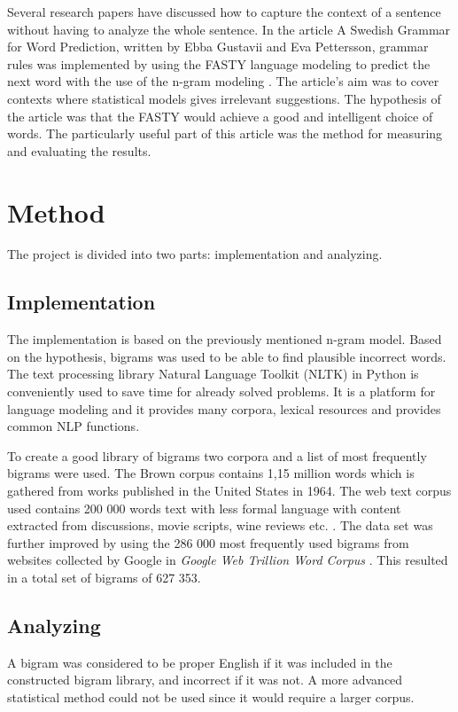 \documentclass[a4paper,12pt]{article}
\begin{document}
Several research papers have discussed how to capture the context of a sentence without having to analyze the whole sentence. In the article A Swedish Grammar for Word Prediction, written by Ebba Gustavii and Eva Pettersson, grammar rules was implemented by using the FASTY language modeling to predict the next word with the use of the n-gram modeling \cite{gustavii2003a}. The article's aim was to cover contexts where statistical models gives irrelevant suggestions. The hypothesis of the article was that the FASTY would achieve a good and intelligent choice of words. The particularly useful part of this article was the method for measuring and evaluating the results.

\section{Method}
\label{sec:method}
The project is divided into two parts: implementation and analyzing.

\subsection{Implementation}
\label{ref:implementation}
The implementation is based on the previously mentioned n-gram model. Based on the hypothesis, bigrams was used to be able to find plausible incorrect words. The text processing library Natural Language Toolkit (NLTK) in Python is conveniently used to save time for already solved problems. It is a platform for language modeling and it provides many corpora, lexical resources and provides common NLP functions\cite{nltk}. 

To create a good library of bigrams  two corpora and a list of most frequently bigrams were used.  The Brown corpus contains 1,15 million words which is gathered from works published in the United States in 1964\cite{francis64brown}. The web text corpus used contains 200 000 words text with less formal language with content extracted from discussions, movie scripts, wine reviews etc. \cite{nltkWebtext}. The data set was further improved by using the 286 000 most frequently used bigrams from websites collected by Google in \emph{Google Web Trillion Word Corpus} \cite{286}.  This resulted in a total set of bigrams of 627 353. 

\subsection{Analyzing}
\label{ref:analyzing}
A bigram was considered to be proper English if it was included in the constructed bigram library, and incorrect if it was not. A more advanced statistical method could not be used since it would require a larger corpus. 
\end{document}

